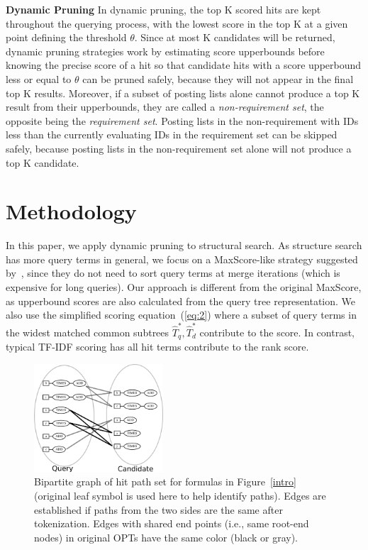 \documentclass[runningheads]{llncs}
\begin{document}
\vspace{0.1in}
\noindent\textbf{Dynamic Pruning}\; In dynamic pruning, the top K scored hits are kept throughout the querying process, with the lowest score in the top K at a given point defining the threshold $\theta$. Since at most K candidates will be returned, dynamic pruning strategies work by estimating score upperbounds before knowing the precise score of a hit so that candidate hits with a score upperbound less or equal to $\theta$ can be pruned safely, because they will not appear in the final top K results.
Moreover, if a subset of posting lists alone cannot produce a top K result from their upperbounds, they are called a \textit{non-requirement set}, the opposite being the \textit{requirement set}.
%
Posting lists in the non-requirement with IDs less than the currently evaluating IDs in the requirement set can be skipped safely, because posting lists in the non-requirement set alone will not produce a top K candidate.

\section{Methodology}
\label{strategy}
In this paper, we apply dynamic pruning to structural search.
As structure search has more query terms in general, we focus on a MaxScore-like strategy suggested by~\cite{Shandongdong2012, antonio2019}, since they do not need to sort query terms at merge iterations (which is expensive for long queries).
%
Our approach is different from the original MaxScore, as upperbound scores are also calculated from the query tree representation.
We also use the simplified scoring equation~(\ref{eq:2})
where a subset of query terms in the widest matched common subtrees $\hat{T}_q^*, \hat{T}_d^*$ contribute to the score.
In contrast, typical TF-IDF scoring has all hit terms contribute to the rank score.

\begin{figure}[!t]
\begin{center}
\includegraphics[width=1.90in]{fig/bipartile.eps}
\caption{Bipartite graph of hit path set for formulas in Figure~\ref{intro} (original leaf symbol is used here to help identify paths). Edges are established if paths from the two sides are the same after tokenization. Edges with shared end points (i.e., same root-end nodes) in original OPTs have the same color (black or gray). }
\label{bipart}
\end{center}
\end{figure}
\end{document}
